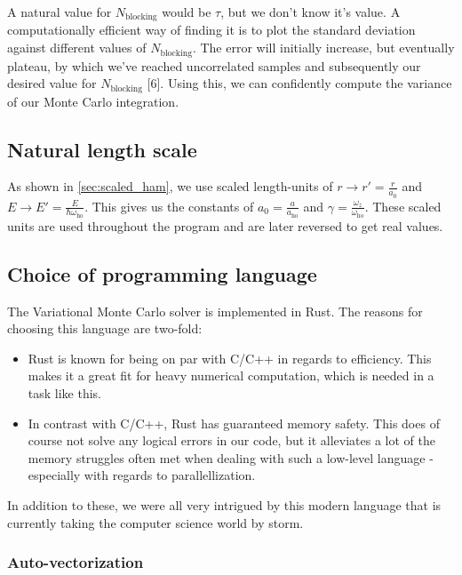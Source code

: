 \documentclass[
]{article}
\providecommand{\tightlist}{%
  \setlength{\itemsep}{0pt}\setlength{\parskip}{0pt}}
\begin{document}
A natural value for \(N_\text{blocking}\) would be \(\tau\), but we
don't know it's value. A computationally efficient way of finding it is
to plot the standard deviation against different values of
\(N_\text{blocking}\). The error will initially increase, but eventually
plateau, by which we've reached uncorrelated samples and subsequently
our desired value for \(N_\text{blocking}\) {[}6{]}. Using this, we can
confidently compute the variance of our Monte Carlo integration.

\hypertarget{natural-length-scale}{%
\subsection{Natural length scale}\label{natural-length-scale}}

As shown in \ref{sec:scaled_ham}, we use scaled length-units of
\(r \rightarrow r' = \frac{r}{a_0}\) and
\(E \rightarrow E' = \frac{E}{\hbar \omega_\text{ho}}\). This gives us
the constants of \(a_0 = \frac{a}{a_\text{ho}}\) and
\(\gamma = \frac{\omega_z}{\omega_\text{ho}}\). These scaled units are
used throughout the program and are later reversed to get real values.

\hypertarget{choice-of-programming-language}{%
\subsection{Choice of programming
language}\label{choice-of-programming-language}}

The Variational Monte Carlo solver is implemented in Rust. The reasons
for choosing this language are two-fold:

\begin{itemize}
\tightlist
\item
  Rust is known for being on par with C/C++ in regards to efficiency.
  This makes it a great fit for heavy numerical computation, which is
  needed in a task like this.
\item
  In contrast with C/C++, Rust has guaranteed memory safety. This does
  of course not solve any logical errors in our code, but it alleviates
  a lot of the memory struggles often met when dealing with such a
  low-level language - especially with regards to parallellization.
\end{itemize}

In addition to these, we were all very intrigued by this modern language
that is currently taking the computer science world by storm.

\hypertarget{auto-vectorization}{%
\subsubsection{Auto-vectorization}\label{auto-vectorization}}
\end{document}
